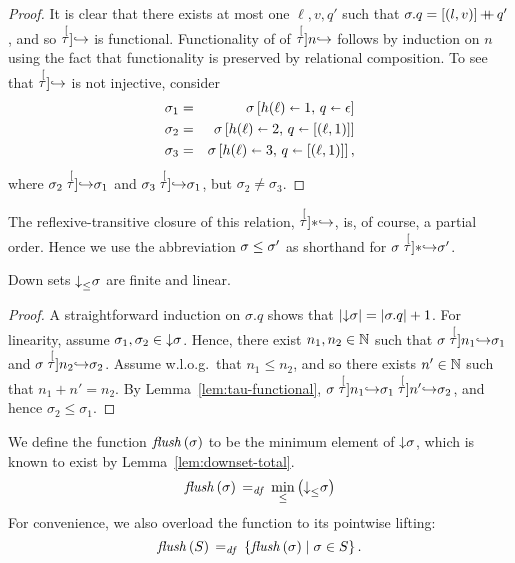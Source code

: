 \documentclass[11pt]{report}
\begin{document}
\begin{proof}
	It is clear that there exists at most one $\ell,v,q'$ such that $\sigma.q = \left[(l,v)\right] \operatorname{+\!\!\!+} q'$, and so $\stackrel[\tau]{}{\operatorname{\hookrightarrow}}$ is functional. Functionality of of $\stackrel[\tau]{n}{\operatorname{\hookrightarrow}}$ follows by induction on $n$ using the fact that functionality is preserved by relational composition. To see that $\stackrel[\tau]{}{\operatorname{\hookrightarrow}}$ is not injective, consider \begin{eqnarray*}
		\sigma_1 & = & \sigma \left[ h(\ell) \shortleftarrow 1,\,q \shortleftarrow \epsilon \right] \\
		\sigma_2 & = & \sigma \left[ h(\ell) \shortleftarrow 2,\,q \shortleftarrow \left[(\ell,1)\right] \right] \\
		\sigma_3 & = & \sigma \left[ h(\ell) \shortleftarrow 3,\,q \shortleftarrow \left[(\ell,1)\right] \right],
	\end{eqnarray*} where $\sigma_2 \stackrel[\tau]{}{\operatorname{\hookrightarrow}} \sigma_1$ and $\sigma_3 \stackrel[\tau]{}{\operatorname{\hookrightarrow}} \sigma_1$, but $\sigma_2 \neq \sigma_3$. 
\end{proof}

The reflexive-transitive closure of this relation, ${\stackrel[\tau]{\ast}{\operatorname{\hookrightarrow}}}$, is, of course, a partial order. Hence we use the abbreviation $\sigma  \leq \sigma'$ as shorthand for $\sigma \stackrel[\tau]{\ast}{\operatorname{\hookrightarrow}} \sigma'$. 

\begin{lemma}
\label{lem:downset-total}
Down sets $\operatorname{\downarrow}_{\leq}\!\sigma$ are finite and linear. 	
\end{lemma}

\begin{proof}
	A straightforward induction on $\sigma.q$ shows that $\left|\operatorname{\downarrow}\!\sigma\right| = |\sigma.q| + 1$. For linearity, assume $\sigma_1, \sigma_2 \in \operatorname{\downarrow}\!\sigma$. Hence, there exist $n_1, n_2 \in \mathbb{N}$ such that $\sigma \stackrel[\tau]{n_1}{\operatorname{\hookrightarrow}} \sigma_1$ and $\sigma \stackrel[\tau]{n_2}{\operatorname{\hookrightarrow}} \sigma_2$. Assume w.l.o.g.~that $n_1 \leq n_2$, and so there exists $n' \in \mathbb{N}$ such that $n_1 + n' = n_2$. By Lemma~\ref{lem:tau-functional}, $\sigma \stackrel[\tau]{n_1}{\operatorname{\hookrightarrow}} \sigma_1 \stackrel[\tau]{n'}{\operatorname{\hookrightarrow}} \sigma_2$, and hence $\sigma_2 \leq \sigma_1$. 
\end{proof}


We define the function $\mathit{flush}\left(\sigma\right)$ to be the minimum element of $\operatorname{\downarrow}\!\sigma$, which is known to exist by Lemma~\ref{lem:downset-total}. 
\begin{equation}
	\label{eq:sflush}
	\mathit{flush}\left(\sigma\right) \operatorname{\;=_{\mathit{df}}\;} \min_{\leq}\left(\operatorname{\downarrow}_{\leq}\!\sigma\right)
\end{equation}
For convenience, we also overload the function to its pointwise lifting: \[ \mathit{flush}\left(S\right) \operatorname{\;=_{\mathit{df}}\;} \left\lbrace \mathit{flush}\left(\sigma\right) \mid \sigma \in S \right\rbrace.\]
\end{document}
